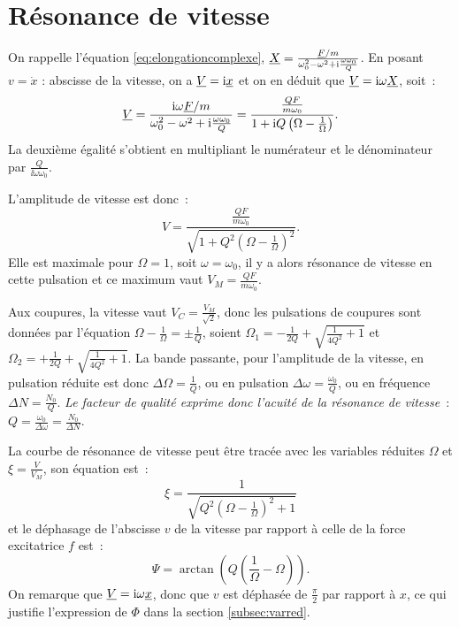 \section{Résonance de vitesse}

On rappelle l'équation \eqref{eq:elongationcomplexe}, \(\underline{X} = 
\frac{\underline{F}/m}{\omega_0^2-\omega^2+\mathrm{i}\frac{\omega\omega_0}{Q}}\). En posant \(v = 
\dot{x}\) : abscisse de la vitesse, on a \(\underline{V} = \mathrm{i} \underline{x}\) et on en déduit que 
\(\underline{V} = \mathrm{i}\omega \underline{X}\), soit~:
\begin{equation}
  \underline{V} = \frac{\mathrm{i}\omega \underline{F}/m}{\omega_0^2-\omega^2+\mathrm{i}\frac{\omega\omega_0}{Q}} 
  = \frac{\frac{QF}{m\omega_0}}{1+\mathrm{i} Q\left(\Omega-\frac{1}{\Omega}\right)}.
\end{equation}
La deuxième égalité s'obtient en multipliant le numérateur et le dénominateur 
par \(\frac{Q}{\ii\omega\omega_0}\).

L'amplitude de vitesse est donc~:
\begin{equation}
  V = 
  \frac{\frac{QF}{m\omega_0}}{\sqrt{1+Q^2\left(\Omega-\frac{1}{\Omega}\right)^2}}.
\end{equation}
Elle est maximale pour \(\Omega = 1\), soit \(\omega = \omega_0\), il y a alors 
résonance de vitesse en cette pulsation et ce maximum vaut \(V_M = 
\frac{QF}{m\omega_0}\).

Aux coupures, la vitesse vaut \(V_C = \frac{V_M}{\sqrt{2}}\), donc les 
pulsations de coupures sont données par l'équation \(\Omega - \frac{1}{\Omega} = 
\pm \frac{1}{Q}\), soient \(\Omega_1 = -\frac{1}{2Q} + \sqrt{\frac{1}{4Q^2}+1}\) 
et \(\Omega_2 = +\frac{1}{2Q} + \sqrt{\frac{1}{4Q^2}+1}\). La bande passante, 
pour l'amplitude de la vitesse, en pulsation réduite est donc \(\Delta\Omega = 
\frac{1}{Q}\), ou en pulsation \(\Delta\omega = \frac{\omega_0}{Q}\), ou en 
fréquence \(\Delta N = \frac{N_0}{Q}\). \emph{Le facteur de qualité exprime donc 
l'acuité de la résonance de vitesse}~: \(Q = \frac{\omega_0}{\Delta\omega} = 
\frac{N_0}{\Delta N}\).

La courbe de résonance de vitesse peut être tracée avec les variables réduites 
\(\Omega\) et \(\xi = \frac{V}{V_M}\), son équation est~:
\begin{equation}
  \xi = \frac{1}{\sqrt{Q^2\left(\Omega - \frac{1}{\Omega}\right)^2 + 1}}
\end{equation}
et le déphasage de l'abscisse \(v\) de la vitesse par rapport à celle de la 
force excitatrice \(f\) est~:
\begin{equation}
  \Psi = \arctan\left(Q\left(\frac{1}{\Omega} - \Omega\right)\right).
\end{equation}
On remarque que \(\underline{V} = \mathrm{i}\omega \underline{x}\), donc que \(v\) est déphasée de 
\(\frac{\pi}{2}\) par rapport à \(x\), ce qui justifie l'expression de \(\Phi\) 
dans la section \ref{subsec:varred}.

